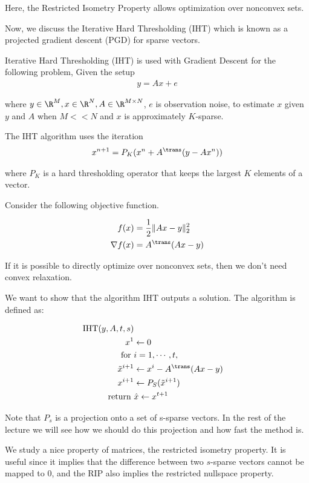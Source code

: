 Here, the Restricted Isometry Property allows optimization over nonconvex sets.


Now, we discuss the Iterative Hard Thresholding (IHT) which is known as a projected gradient descent (PGD) for sparse vectors.

Iterative Hard Thresholding (IHT) is used with Gradient Descent for the following problem,
Given the setup
\begin{align}
y = A x + e 
\end{align}

where $y \in \R^M, x \in \R^N, A \in \R^{M \times N}$, $e$ is observation noise, to estimate $x$ given $y$ and $A$ when $M <<N$ and $x$ is approximately $K$-sparse.

The IHT algorithm uses the iteration
\begin{align}
x^{n+1} = P_K ( x^n + A^{\trans} (y - A x^n))
\end{align}

where $P_K$ is a hard thresholding operator that keeps the largest $K$ elements of a vector.

Consider the following objective function.

\begin{align}
f(x) &= \frac{1}{2} \| Ax - y \|_2^2 \\
\nabla f(x) &= A^{\trans}(Ax - y)
\end{align}

If it is possible to directly optimize over nonconvex sets, then we don't need convex relaxation.

We want to show that the algorithm IHT outputs a solution. The algorithm is defined as:

\begin{align*}
\text{IHT}(y, A, t, s) \\
x^1 &\leftarrow 0 \\
\text{ for } &i=1 ,\cdots, t, \\
\tilde{x}^{i+1} &\leftarrow x^i - A^{\trans} (Ax - y) \\
x^{i+1} &\leftarrow P_S( \tilde{x}^{i+1} ) \\
\text{ return }& \hat{x} \leftarrow x^{t+1}
\end{align*}

Note that $P_s$ is a projection onto a set of s-sparse vectors. In the rest of the lecture we will see how we should do this projection and how fast the method is.


We study a nice property of matrices, the restricted isometry property. It is useful since it implies that the difference between two $s$-sparse vectors cannot be mapped to 0, and the RIP also implies the restricted nullspace property.


